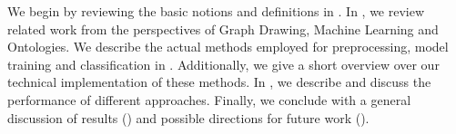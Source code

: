 \documentclass[
	fontsize=10pt, %
	twoside=false, %
	secnumdepth=1, %
  toc=indentunnumbered %
]{kaobook}
\begin{document}




We begin by reviewing the basic notions and definitions in
. In , we review related work from the
perspectives of Graph Drawing, Machine Learning and Ontologies.
We describe the actual methods employed for preprocessing, model training and
classification in . Additionally, we give a short overview over
our technical implementation of these methods. In ,
we describe and discuss the performance of different approaches. Finally, we
conclude with a general discussion of results () and
possible directions for future work ().









\end{document}
